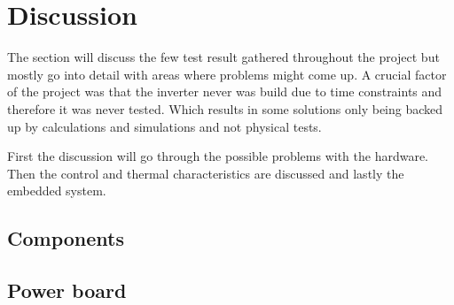 \section{Discussion}
\label{sec:discussion}

The section will discuss the few test result gathered throughout the project but mostly go into detail with areas where problems might come up.
A crucial factor of the project was that the inverter never was build due to time constraints and therefore it was never tested. Which results in some solutions only being backed up by calculations and simulations and not physical tests.


First the discussion will go through the possible problems with the hardware. Then the control and thermal characteristics are discussed and lastly the embedded system.




\subsection{Components}





\subsection{Power board}
